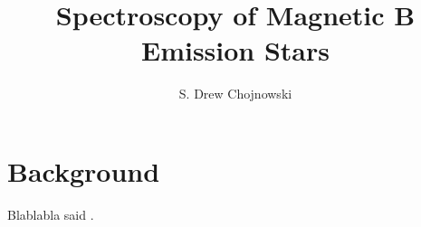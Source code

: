 \documentclass[preprint2]{aastex}
\begin{document}
\title{Spectroscopy of Magnetic B Emission Stars}


\author{S. Drew Chojnowski}

\vspace{0.5cm}

\section{Background}

Blablabla said \citet{wis15}.






{}

\end{document}
